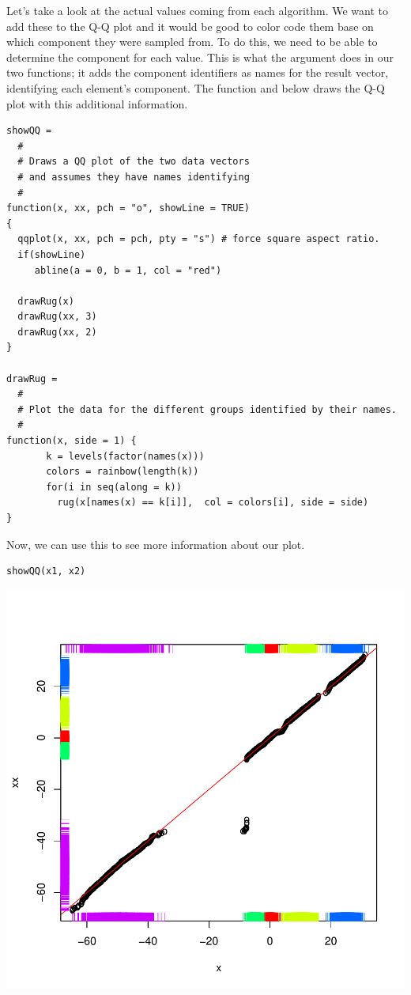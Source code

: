 Let's take a look at the actual values coming from each algorithm.  We
want to add these to the Q-Q plot and it would be good to color code
them base on which component they were sampled from.  To do this, we
need to be able to determine the component for each value.  This is
what the  argument does in our two functions;
it adds the component identifiers as names for the  result vector, 
identifying each element's component.
The function  and  below 
draws the Q-Q plot with this additional information.
{\footnotesize{
\begin{verbatim}
showQQ =
  #
  # Draws a QQ plot of the two data vectors
  # and assumes they have names identifying
  #
function(x, xx, pch = "o", showLine = TRUE)
{  
  qqplot(x, xx, pch = pch, pty = "s") # force square aspect ratio.
  if(showLine)
     abline(a = 0, b = 1, col = "red")

  drawRug(x)
  drawRug(xx, 3)
  drawRug(xx, 2)
}

drawRug =
  #
  # Plot the data for the different groups identified by their names.
  #
function(x, side = 1) {
       k = levels(factor(names(x)))
       colors = rainbow(length(k))
       for(i in seq(along = k))
         rug(x[names(x) == k[i]],  col = colors[i], side = side)
}
\end{verbatim}
}}

Now, we can use this to see more information about our plot.
\begin{verbatim}
showQQ(x1, x2)
\end{verbatim}
\includegraphics{RNG/images/algorithmRugQQ.pdf}

